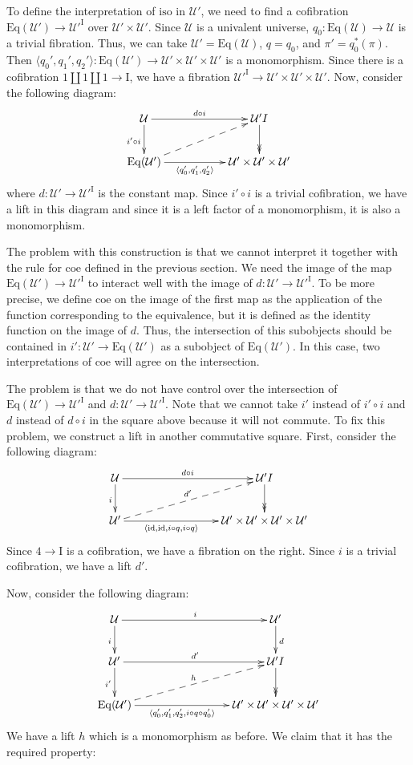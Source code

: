 \documentclass{amsart}
\theoremstyle{definition}
\theoremstyle{remark}
\newcommand{\fs}[1]{\mathrm{#1}}
\newcommand{\I}{\fs{I}}
\newcommand{\coe}{\fs{coe}}
\newcommand{\iso}{\fs{iso}}
\newcommand{\id}{\fs{id}}
\newcommand{\U}{\mathcal{U}}
\newcommand{\Eq}{\fs{Eq}}
\numberwithin{figure}{section}
\begin{document}
To define the interpretation of $\iso$ in $\U'$, we need to find a cofibration $\Eq(\U') \to \U'^\I$ over $\U' \times \U'$.
Since $\U$ is a univalent universe, $q_0 : \Eq(\U) \to \U$ is a trivial fibration.
Thus, we can take $\U' = \Eq(\U)$, $q = q_0$, and $\pi' = q_0^*(\pi)$.
Then $\langle q_0', q_1', q_2' \rangle : \Eq(\U') \to \U' \times \U' \times \U'$ is a monomorphism.
Since there is a cofibration $1 \amalg 1 \amalg 1 \to \I$, we have a fibration $\U'^\I \to \U' \times \U' \times \U'$.
Now, consider the following diagram:
\[ \xymatrix{ \U \ar[rr]^-{d \circ i} \ar[d]_{i' \circ i}                  & & \U'^\I \ar@{->>}[d] \\
              \Eq(\U') \ar[rr]_-{\langle q_0', q_1', q_2' \rangle} \ar@{-->}[urr]   & & \U' \times \U' \times \U'
            } \]
where $d : \U' \to \U'^\I$ is the constant map.
Since $i' \circ i$ is a trivial cofibration, we have a lift in this diagram and since it is a left factor of a monomorphism, it is also a monomorphism.

The problem with this construction is that we cannot interpret it together with the rule for $\coe$ defined in the previous section.
We need the image of the map $\Eq(\U') \to \U'^\I$ to interact well with the image of $d : \U' \to \U'^\I$.
To be more precise, we define $\coe$ on the image of the first map as the application of the function corresponding to the equivalence, but it is defined as the identity function on the image of $d$.
Thus, the intersection of this subobjects should be contained in $i' : \U' \to \Eq(\U')$ as a subobject of $\Eq(\U')$.
In this case, two interpretations of $\coe$ will agree on the intersection.

The problem is that we do not have control over the intersection of $\Eq(\U') \to \U'^\I$ and $d : \U' \to \U'^\I$.
Note that we cannot take $i'$ instead of $i' \circ i$ and $d$ instead of $d \circ i$ in the square above because it will not commute.
To fix this problem, we construct a lift in another commutative square.
First, consider the following diagram:
\[ \xymatrix{ \U \ar[rrr]^-{d \circ i} \ar[d]_{i}                                                   & & & \U'^\I \ar@{->>}[d] \\
              \U' \ar[rrr]_-{\langle \id, \id, i \circ q, i \circ q \rangle} \ar@{-->}[urrr]^{d'}   & & & \U' \times \U' \times \U' \times \U'
            } \]
Since $4 \to \I$ is a cofibration, we have a fibration on the right.
Since $i$ is a trivial cofibration, we have a lift $d'$.

Now, consider the following diagram:
\[ \xymatrix{ \U \ar[rrr]^i \ar[d]_i                                                                        & & & \U' \ar[d]^d \\
              \U' \ar[rrr]^{d'} \ar[d]_{i'}                                                                 & & & \U'^\I \ar@{->>}[d] \\
              \Eq(\U') \ar[rrr]_-{\langle q_0', q_1', q_2', i \circ q \circ q_0' \rangle} \ar@{-->}[urrr]^h & & & \U' \times \U' \times \U' \times \U'
            } \]
We have a lift $h$ which is a monomorphism as before.
We claim that it has the required property:
\end{document}
